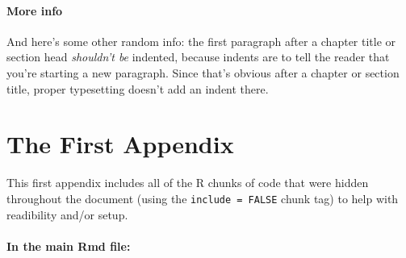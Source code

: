 \documentclass[12pt,twoside]{amherstthesis}
\begin{document}
  \subsubsection{More info}\label{more-info}
  
  And here's some other random info: the first paragraph after a chapter
  title or section head \emph{shouldn't be} indented, because indents are
  to tell the reader that you're starting a new paragraph. Since that's
  obvious after a chapter or section title, proper typesetting doesn't add
  an indent there.
  
  \appendix
  
  \singlespacing
  
  \chapter{The First Appendix}\label{the-first-appendix}
  
  This first appendix includes all of the R chunks of code that were
  hidden throughout the document (using the \texttt{include\ =\ FALSE}
  chunk tag) to help with readibility and/or setup.
  
  \subsubsection{In the main Rmd file:}\label{in-the-main-rmd-file}
  
  \begin{Shaded}
  \begin{Highlighting}[]
  \NormalTok{(}\OperatorTok{!}
    \NormalTok{(}\NormalTok{, } \NormalTok{)}
  \NormalTok{(}\OperatorTok{!}
  \OperatorTok{::}\NormalTok{(}\NormalTok{)}
  \NormalTok{\}}
  \end{Highlighting}
  \end{Shaded}
  
\end{document}

